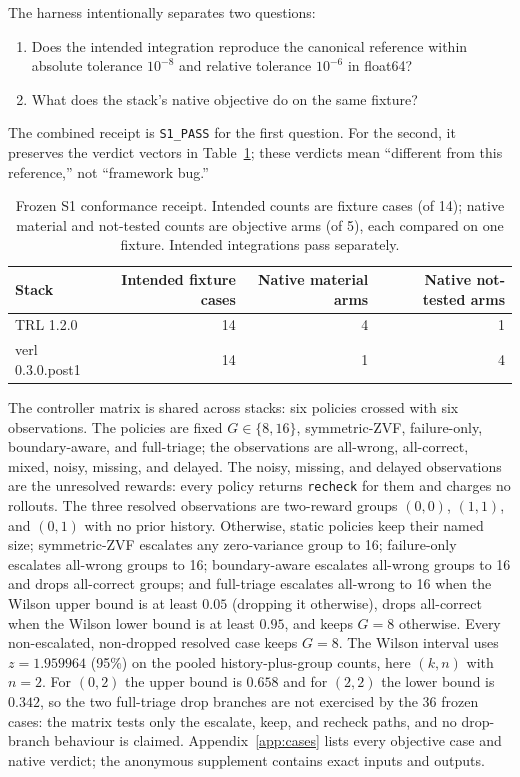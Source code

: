 \documentclass{article}
\begin{document}
The harness intentionally separates two questions:
\begin{enumerate}[leftmargin=*,itemsep=2pt]
  \item Does the intended integration reproduce the canonical reference within
  absolute tolerance $10^{-8}$ and relative tolerance $10^{-6}$ in float64?
  \item What does the stack's native objective do on the same fixture?
\end{enumerate}
The combined receipt is \texttt{S1\_PASS} for the first question.  For the
second, it preserves the verdict vectors in Table~\ref{tab:s1}; these verdicts
mean ``different from this reference,'' not ``framework bug.''

\begin{table}[t]
  \centering
  \caption{Frozen S1 conformance receipt. Intended counts are fixture cases
  (of 14); native material and not-tested counts are objective arms (of 5),
  each compared on one fixture.  Intended integrations pass separately.}
  \label{tab:s1}
  \begin{tabular}{lrrr}
    \toprule
    Stack & Intended fixture cases & Native material arms & Native not-tested arms \\
    \midrule
    TRL 1.2.0 & 14 & 4 & 1 \\
    verl 0.3.0.post1 & 14 & 1 & 4 \\
    \bottomrule
  \end{tabular}
\end{table}

The controller matrix is shared across stacks: six policies crossed with six
observations.  The policies are fixed $G\in\{8,16\}$, symmetric-ZVF,
failure-only, boundary-aware, and full-triage; the observations are all-wrong,
all-correct, mixed, noisy, missing, and delayed.  The noisy, missing, and
delayed observations are the unresolved rewards: every policy returns
\texttt{recheck} for them and charges no rollouts.  The three resolved
observations are two-reward groups $(0,0)$, $(1,1)$, and $(0,1)$ with no prior
history.  Otherwise, static policies keep their named size; symmetric-ZVF
escalates any zero-variance group to 16; failure-only escalates all-wrong
groups to 16; boundary-aware escalates all-wrong groups to 16 and drops
all-correct groups; and full-triage escalates all-wrong to 16 when the Wilson
upper bound is at least $0.05$ (dropping it otherwise), drops all-correct when
the Wilson lower bound is at least $0.95$, and keeps $G=8$ otherwise.  Every
non-escalated, non-dropped resolved case keeps $G=8$.  The Wilson interval \citep{wilson1927probable} uses
$z=1.959964$ (95\%) on the pooled history-plus-group counts, here $(k,n)$ with
$n=2$.  For $(0,2)$ the upper bound is $0.658$ and for $(2,2)$ the lower bound
is $0.342$, so the two full-triage drop branches are not exercised by the 36
frozen cases: the matrix tests only the escalate, keep, and recheck paths,
and no drop-branch behaviour is claimed.
Appendix~\ref{app:cases} lists every objective case and native verdict; the
anonymous supplement contains exact inputs and outputs.
\end{document}
